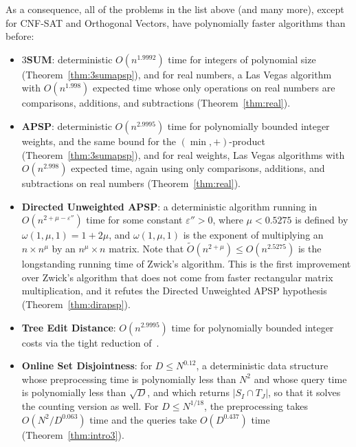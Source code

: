 As a consequence, all of the problems in the list above (and many more), except for CNF-SAT and Orthogonal Vectors, have polynomially faster algorithms than before:
\begin{itemize}



\item \textbf{$3$SUM}: deterministic $O(n^{1.9992})$ time for integers of polynomial size (Theorem~\ref{thm:3sumapsp}), and for real numbers, a Las Vegas algorithm with $O(n^{1.998})$ expected time whose only operations on real numbers are comparisons, additions, and subtractions (Theorem~\ref{thm:real}).




\item \textbf{APSP}: deterministic $O(n^{2.9995})$ time for polynomially bounded integer weights, and the same bound for the $(\min,+)$-product (Theorem~\ref{thm:3sumapsp}), and for real weights, Las Vegas algorithms with $O(n^{2.998})$ expected time, again using only comparisons, additions, and subtractions on real numbers (Theorem~\ref{thm:real}).

\item \textbf{Directed Unweighted APSP}: a deterministic algorithm running in $O(n^{2+\mu-\varepsilon''})$ time for some constant $\varepsilon''>0$, where $\mu<0.5275$ is defined by $\omega(1,\mu,1)=1+2\mu$, and $\omega(1,\mu,1)$ is the exponent of multiplying an $n\times n^\mu$ by an $n^\mu\times n$ matrix.
Note that $\tilde O(n^{2+\mu})\leq O(n^{2.5275})$ is the longstanding running time of Zwick's algorithm. This is the first improvement over Zwick's algorithm that does not come from faster rectangular matrix multiplication, and it refutes the Directed Unweighted APSP hypothesis~\cite{CVX21,CVX23,Fis26} (Theorem~\ref{thm:dirapsp}).

\item \textbf{Tree Edit Distance}: $O(n^{2.9995})$ time for polynomially bounded integer costs via the tight reduction of~\cite{NPSVXY25}.


\item \textbf{Online Set Disjointness}: for $D\le N^{0.12}$, a deterministic data structure whose preprocessing time is polynomially less than $N^2$ and whose query time is polynomially less than $\sqrt D$, and which returns $|S_I\cap T_J|$, so that it solves the counting version as well. For $D\le N^{1/18}$, the preprocessing takes $O(N^2/D^{0.063})$ time and the queries take $O(D^{0.437})$ time (Theorem~\ref{thm:intro3}). 
\end{itemize}

